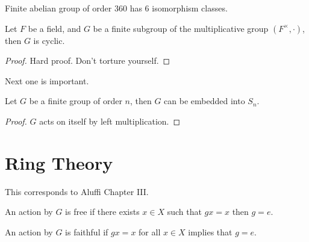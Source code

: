 \documentclass[openany]{book}
\begin{document}
\begin{example}
    Finite abelian group of order $360$ has $6$ isomorphism classes.
\end{example}


\begin{thm}
    Let $F$ be a field, and $G$ be a finite subgroup of the multiplicative group $(F^\times, \cdot)$, then $G$ is cyclic.
\end{thm}
\begin{proof}
    Hard proof. Don't torture yourself.
\end{proof}


\begin{warn}
    Next one is important.
\end{warn}


\begin{prop}
    Let $G$ be a finite group of order $n$, then $G$ can be embedded into $S_n$.
\end{prop}
\begin{proof}
    $G$ acts on itself by left multiplication.
\end{proof}










































\chapter{Ring Theory}
This corresponds to Aluffi Chapter III.

\begin{defn}
    An action by $G$ is free if there exists $x\in X$ such that $gx=x$ then $g=e$.
\end{defn}

\begin{defn}
    An action by $G$ is faithful if $gx=x$ for all $x\in X$ implies that $g=e$.
\end{defn}
\end{document}
